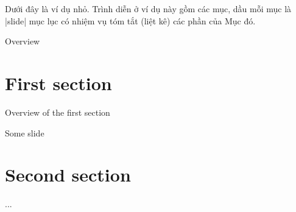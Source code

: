 Dưới đây là ví dụ nhỏ. Trình diễn ở ví dụ này gồm các mục,
dầu mỗi mục là |slide| mục lục có nhiệm vụ tóm tắt (liệt kê) các
phần của Mục đó.
\begin{example}
 \begin{slide}[toc=,bm=]{Overview}
   \tableofcontents[content=sections]
 \end{slide}
 \section{First section}
 \begin{slide}[toc=,bm=]{Overview of the first section}
   \tableofcontents[content=currentsection,type=1]
 \end{slide}
 \begin{slide}{Some slide}
 \end{slide}
 \section{Second section}
 ...
\end{example}
\endinput
